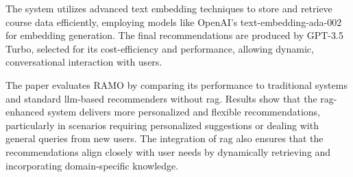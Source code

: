 The system utilizes advanced text embedding techniques to store and retrieve course data efficiently, employing models like OpenAI's text-embedding-ada-002 for embedding generation.
The final recommendations are produced by GPT-3.5 Turbo, selected for its cost-efficiency and performance, allowing dynamic, conversational interaction with users.

The paper evaluates RAMO by comparing its performance to traditional systems and standard \gls{llm}-based recommenders without \gls{rag}.
Results show that the \gls{rag}-enhanced system delivers more personalized and flexible recommendations, particularly in scenarios requiring personalized suggestions or dealing with general queries from new users.
The integration of \gls{rag} also ensures that the recommendations align closely with user needs by dynamically retrieving and incorporating domain-specific knowledge.